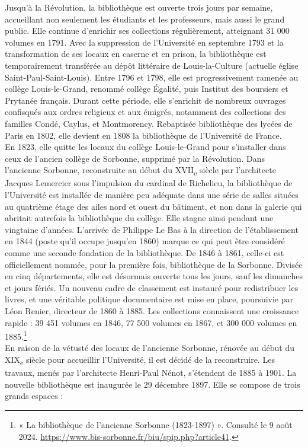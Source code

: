 \documentclass[a4paper,12pt,twoside]{book}
\begin{document}
Jusqu'à la Révolution, la bibliothèque est ouverte trois
jours par semaine, accueillant non seulement les étudiants et les
professeurs, mais aussi le grand public. Elle continue
d'enrichir ses collections régulièrement, atteignant 31
000 volumes en 1791. Avec la suppression de l'Université en septembre
1793 et la transformation de ses locaux en caserne et en prison, la
bibliothèque est temporairement transférée au dépôt littéraire de
Louis-la-Culture (actuelle église Saint-Paul-Saint-Louis). Entre 1796 et
1798, elle est progressivement ramenée au collège Louis-le-Grand,
renommé collège Égalité, puis Institut des boursiers et Prytanée
français. Durant cette période, elle s'enrichit de nombreux ouvrages
confisqués aux ordres religieux et aux émigrés, notamment des
collections des familles Condé, Caylus, et Montmorency. Rebaptisée
bibliothèque des lycées de Paris en 1802, elle devient en 1808 la
bibliothèque de l'Université de France. \\

En 1823, elle quitte les locaux du collège Louis-le-Grand pour
s'installer dans ceux de l'ancien collège de Sorbonne,
supprimé par la Révolution. Dans l'ancienne Sorbonne, reconstruite au
début du XVII\textsubscript{e} siècle par l'architecte Jacques Lemercier
sous l'impulsion du cardinal de Richelieu, la
bibliothèque de l'Université est installée de manière peu adéquate dans
une série de salles situées au quatrième étage des ailes nord et ouest
du bâtiment, et non dans la galerie qui abritait autrefois la
bibliothèque du collège. Elle stagne ainsi pendant une vingtaine
d'années. L'arrivée de Philippe Le Bas à la direction de l'établissement
en 1844 (poste qu'il occupe jusqu'en 1860) marque ce qui peut être
considéré comme une seconde fondation de la bibliothèque. De 1846 à
1861, celle-ci est officiellement nommée, pour la première fois,
bibliothèque de la Sorbonne. Divisée en cinq départements, elle est
désormais ouverte tous les jours, sauf les dimanches et jours fériés. Un
nouveau cadre de classement est instauré pour redistribuer les livres,
et une véritable politique documentaire est mise en place, poursuivie
par Léon Renier, directeur de 1860 à 1885. Les collections connaissent
une croissance rapide : 39 451 volumes en 1846, 77 500 volumes en 1867,
et 300 000 volumes en 1885.\footnote{« La bibliothèque de l'ancienne
	Sorbonne (1823-1897) ». Consulté le 9 août 2024.
	\url{https://www.bis-sorbonne.fr/biu/spip.php?article41}.} \\

En raison de la vétusté des locaux de l'ancienne
Sorbonne, rénovée au début du XIX\textsubscript{e} siècle pour accueillir
l'Université, il est décidé de la reconstruire. Les
travaux, menés par l'architecte Henri-Paul Nénot,
s'étendent de 1885 à 1901. La nouvelle bibliothèque est
inaugurée le 29 décembre 1897. Elle se compose de trois grands espaces : \\
\end{document}
